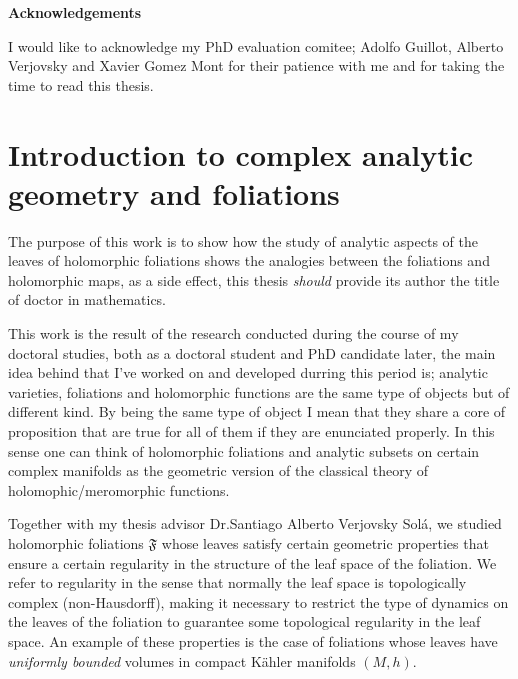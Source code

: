 \documentclass[12pt,twoside,a4paper]{report}
\begin{document}
  \clearpage
  \thispagestyle{plain}
  \begin{center} 
      \huge\textbf{Acknowledgements}\\
  \end{center}
      \normalsize
      I would like to acknowledge my PhD evaluation comitee; Adolfo Guillot, Alberto Verjovsky and Xavier Gomez Mont for their patience with me and for taking the time to read this thesis.
  \clearpage


  \tableofcontents %
  \listoftables   %


  \chapter{Introduction to complex analytic geometry and foliations}
  \pagestyle{fancy}
  \fancyhf{}
  \fancyhead[LE]{\rightmark}
  \fancyhead[RO]{\leftmark}
  \fancyfoot[C]{\thepage}
  \noindent The purpose of this work is to show how the study of analytic aspects of the leaves of holomorphic foliations shows the analogies between the foliations and holomorphic maps, as a side effect, this thesis \emph{should} provide its author the title of doctor in mathematics.

  This work is the result of the research conducted during the course of my doctoral studies, both as a doctoral student and PhD candidate later, the main idea behind that I've worked on and developed durring this period is; analytic varieties, foliations and holomorphic functions are the same type of objects but of different kind. By being the same type of object I mean that they share a core of proposition that are true for all of them if they are enunciated properly. In this sense one can think of holomorphic foliations and analytic subsets on certain complex manifolds as the geometric version of the classical theory of holomophic/meromorphic functions.

  Together with my thesis advisor Dr.Santiago Alberto Verjovsky Solá, we studied holomorphic foliations $\mathfrak{F}$ whose leaves satisfy certain geometric properties that ensure a certain regularity in the structure of the leaf space of the foliation. We refer to regularity in the sense that normally the leaf space is topologically complex (non-Hausdorff), making it necessary to restrict the type of dynamics on the leaves of the foliation to guarantee some topological regularity in the leaf space. An example of these properties is the case of foliations whose leaves have \emph{uniformly bounded} volumes in compact K\"ahler manifolds $(M,h)$.
\end{document}
